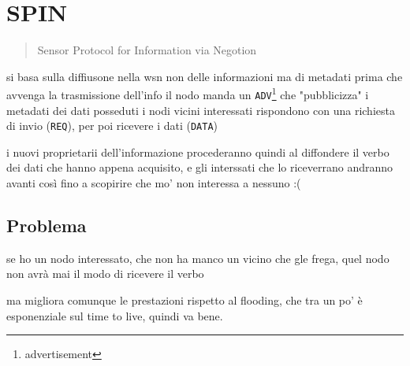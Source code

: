 \documentclass[11pt]{article}
\begin{document}
\section{SPIN}
\label{sec:org913ff96}
\begin{quote}
Sensor Protocol for Information via Negotion
\end{quote}

si basa sulla diffiusone nella wsn non delle informazioni ma di metadati
prima che avvenga la trasmissione dell'info il nodo manda un \texttt{ADV}\footnote{advertisement} che "pubblicizza" i metadati dei dati posseduti
i nodi vicini interessati rispondono con una richiesta di invio (\texttt{REQ}), per poi ricevere i dati (\texttt{DATA})

i nuovi proprietarii dell'informazione procederanno quindi al diffondere il verbo dei dati che hanno appena acquisito, e gli interssati che lo riceverrano andranno avanti così fino a scopirire che mo' non interessa a nessuno :(

\subsection{Problema}
\label{sec:orgbc8a4e5}
se ho un nodo interessato, che non ha manco un vicino che gle frega, quel nodo non avrà mai il modo di ricevere il verbo

ma migliora comunque le prestazioni rispetto al flooding, che tra un po' è esponenziale sul time to live, quindi va bene.
\end{document}
